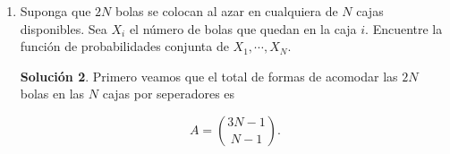 \documentclass[letterpaper]{article}
\theoremstyle{definition}
\theoremstyle{lemathm}
\theoremstyle{lemathm}
\newtheorem{sol}{Solución}
\theoremstyle{lemathm}
\theoremstyle{lemademthm}
\newcommand{\pars}[1]{\left( #1 \right) }
\newcommand{\ceil}[1]{\left \lceil #1 \right\rceil }
\newcommand{\set}[1]{\left \{ #1 \right\} }
\newcommand{\NN}{\mathbb{N}}
\newcommand{\1}{\mathbbm{1}}
\begin{document}
\begin{enumerate}
\begin{sol}
			Ahora veamos que por definición de función de probabilidades tenemos que

			\[f_X(x) = \sum_{y=\ceil{\sqrt{x}}}^{N^2} f_{X,Y}(x,y),\]

			entonces

			\begin{align*}
				f_X(x) &= \sum_{y=\ceil{\sqrt{x}}}^{N^2} f_{X,Y}(x,y)\\
				&= \sum_{y=\ceil{\sqrt{x}}}^{N^2} \frac{60}{N^2(N^2+1)(2N^2+1)(3N^4+3N^2+4)}x\\
				&= \frac{60x}{N^2(N^2+1)(2N^2+1)(3N^4+3N^2+4)} \pars{N-\ceil{\sqrt{x}} + 1},
			\end{align*}

			claro si $x \in \set{1,\cdots,N^2}$ en otro caso $0$, y análogamente

			\begin{align*}
				f_Y(y) &= \sum_{x=1}^{\min\pars{y^2,N^2}} f_{X,Y}(x,y)\\
				&= \sum_{x=1}^{\min\pars{y^2,N^2}} \frac{60}{N^2(N^2+1)(2N^2+1)(3N^4+3N^2+4)}x\\
				&= \frac{60}{N^2(N^2+1)(2N^2+1)(3N^4+3N^2+4)} \sum_{x=1}^{\min\pars{y^2,N^2}} x\\
				&= \frac{30\pars{\min\pars{y^2,N^2}(\min\pars{y^2,N^2}+1)}}{N^2(N^2+1)(2N^2+1)(3N^4+3N^2+4)}.
			\end{align*}

			si $y \in \set{1,\cdots,N^2}$ en otro caso $0$.

			Notemos que en este caso $X$ y $Y$ no son independientes.
			
		\end{sol}

		\item Suponga que $2N$ bolas se colocan al azar en cualquiera de $N$ cajas disponibles. Sea $X_i$ el número de bolas que quedan en la caja $i$. Encuentre la función de probabilidades conjunta de $X_1,\cdots,X_N$.
		
		\begin{sol}
			Primero veamos que el total de formas de acomodar las $2N$ bolas en las $N$ cajas por seperadores es

			\[A = \binom{3N-1}{N-1}.\]



\end{sol}
\end{enumerate}
\end{document}
